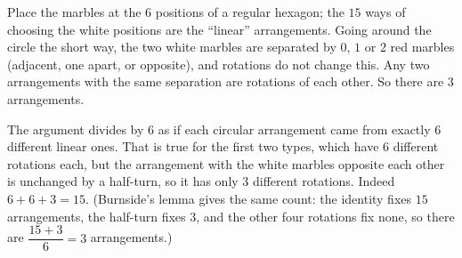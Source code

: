 Place the marbles at the $6$ positions of a regular hexagon; the $15$ ways of choosing the white positions are the ``linear'' arrangements. Going around the circle the short way, the two white marbles are separated by $0$, $1$ or $2$ red marbles (adjacent, one apart, or opposite), and rotations do not change this. Any two arrangements with the same separation are rotations of each other. So there are $\boxed{3}$ arrangements.

The argument divides by $6$ as if each circular arrangement came from exactly $6$ different linear ones. That is true for the first two types, which have $6$ different rotations each, but the arrangement with the white marbles opposite each other is unchanged by a half-turn, so it has only $3$ different rotations. Indeed $6+6+3=15$. (Burnside's lemma gives the same count: the identity fixes $15$ arrangements, the half-turn fixes $3$, and the other four rotations fix none, so there are $\dfrac{15+3}{6}=3$ arrangements.)
